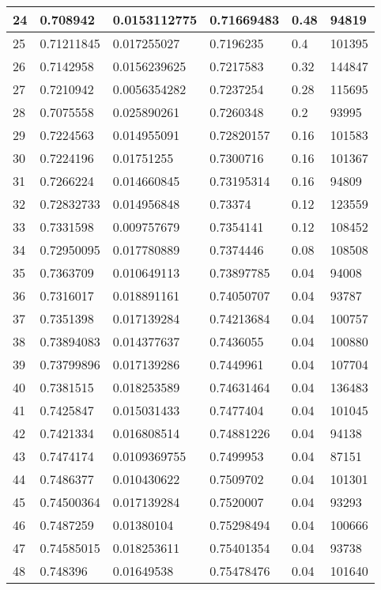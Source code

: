 \begin{longtable}{|l|l|l|l|l|l|}
24 & 0.708942 & 0.0153112775 & 0.71669483 & 0.48 & 94819 \\ \hline 
25 & 0.71211845 & 0.017255027 & 0.7196235 & 0.4 & 101395 \\ \hline 
26 & 0.7142958 & 0.0156239625 & 0.7217583 & 0.32 & 144847 \\ \hline 
27 & 0.7210942 & 0.0056354282 & 0.7237254 & 0.28 & 115695 \\ \hline 
28 & 0.7075558 & 0.025890261 & 0.7260348 & 0.2 & 93995 \\ \hline 
29 & 0.7224563 & 0.014955091 & 0.72820157 & 0.16 & 101583 \\ \hline 
30 & 0.7224196 & 0.01751255 & 0.7300716 & 0.16 & 101367 \\ \hline 
31 & 0.7266224 & 0.014660845 & 0.73195314 & 0.16 & 94809 \\ \hline 
32 & 0.72832733 & 0.014956848 & 0.73374 & 0.12 & 123559 \\ \hline 
33 & 0.7331598 & 0.009757679 & 0.7354141 & 0.12 & 108452 \\ \hline 
34 & 0.72950095 & 0.017780889 & 0.7374446 & 0.08 & 108508 \\ \hline 
35 & 0.7363709 & 0.010649113 & 0.73897785 & 0.04 & 94008 \\ \hline 
36 & 0.7316017 & 0.018891161 & 0.74050707 & 0.04 & 93787 \\ \hline 
37 & 0.7351398 & 0.017139284 & 0.74213684 & 0.04 & 100757 \\ \hline 
38 & 0.73894083 & 0.014377637 & 0.7436055 & 0.04 & 100880 \\ \hline 
39 & 0.73799896 & 0.017139286 & 0.7449961 & 0.04 & 107704 \\ \hline 
40 & 0.7381515 & 0.018253589 & 0.74631464 & 0.04 & 136483 \\ \hline 
41 & 0.7425847 & 0.015031433 & 0.7477404 & 0.04 & 101045 \\ \hline 
42 & 0.7421334 & 0.016808514 & 0.74881226 & 0.04 & 94138 \\ \hline 
43 & 0.7474174 & 0.0109369755 & 0.7499953 & 0.04 & 87151 \\ \hline 
44 & 0.7486377 & 0.010430622 & 0.7509702 & 0.04 & 101301 \\ \hline 
45 & 0.74500364 & 0.017139284 & 0.7520007 & 0.04 & 93293 \\ \hline 
46 & 0.7487259 & 0.01380104 & 0.75298494 & 0.04 & 100666 \\ \hline 
47 & 0.74585015 & 0.018253611 & 0.75401354 & 0.04 & 93738 \\ \hline 
48 & 0.748396 & 0.01649538 & 0.75478476 & 0.04 & 101640 \\ \hline 

\end{longtable}
